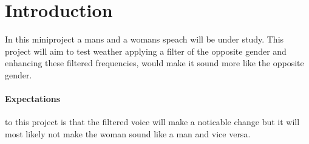 
\section{Introduction}
In this miniproject a mans and a womans speach will be under study. This project will aim to test weather applying a filter of the opposite gender and enhancing these filtered frequencies, would make it sound more like the opposite gender.

\paragraph{Expectations} to this project is that the filtered voice will make a noticable change but it will most likely not make the woman sound like a man and vice versa.
